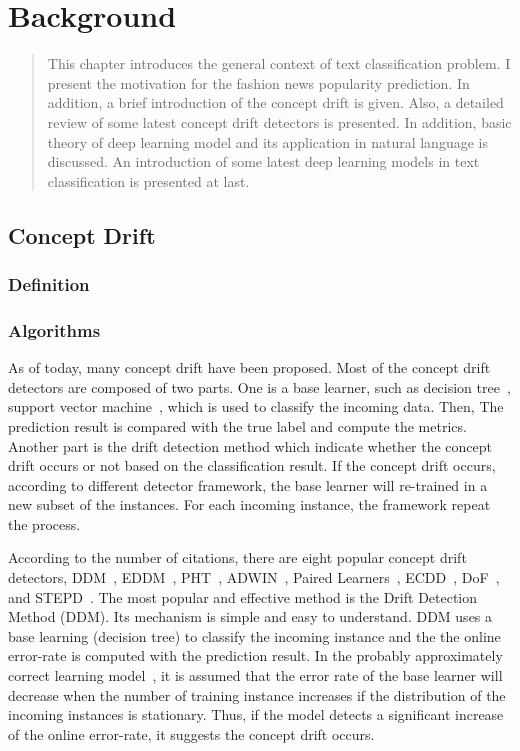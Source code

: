 \chapter{Background}
\label{background}

\begin{quote}
This chapter introduces the general context of text classification problem. I present the motivation for the fashion news popularity prediction. In addition, a brief introduction of the concept drift is given. Also, a detailed review of some latest concept drift detectors is presented. In addition, basic theory of deep learning model and its application in natural language is discussed. An introduction of some latest deep learning models in text classification is presented at last.
\end{quote}

\section{Concept Drift}
\subsection{Definition}
\subsection{Algorithms}
As of today, many concept drift have been proposed. Most of the concept drift detectors are composed of two parts. One is a base learner, such as decision tree~\cite{wang2003mining}, support vector machine~\cite{klinkenberg2000detecting}, which is used to classify the incoming data. Then, The prediction result is compared with the true label and compute the metrics. Another part is the drift detection method which indicate whether the concept drift occurs or not based on the classification result. If the concept drift occurs, according to different detector framework, the base learner will re-trained in a new subset of the instances. For each incoming instance, the framework repeat the process. 

According to the number of citations, there are eight popular concept drift detectors, DDM~\cite{gama2004learning}, EDDM~\cite{baena2006ear}, PHT~\cite{page1954continuous}, ADWIN~\cite{bifet2007learning}, Paired Learners~\cite{bach2008paired}, ECDD~\cite{ross2012exponentially}, DoF~\cite{sobhani2011new}, and STEPD~\cite{nishida2007detecting}. The most popular and effective method is the Drift Detection Method (DDM). Its mechanism is simple and easy to understand. DDM uses a base learning (decision tree) to classify the incoming instance and the the online error-rate is computed with the prediction result. In the probably approximately correct learning model~\cite{michalski2013machine}, it is assumed that the error rate of the base learner will decrease when the number of training instance increases if the distribution of the incoming instances is stationary. Thus, if the model detects a significant increase of the online error-rate, it suggests the concept drift occurs. 

